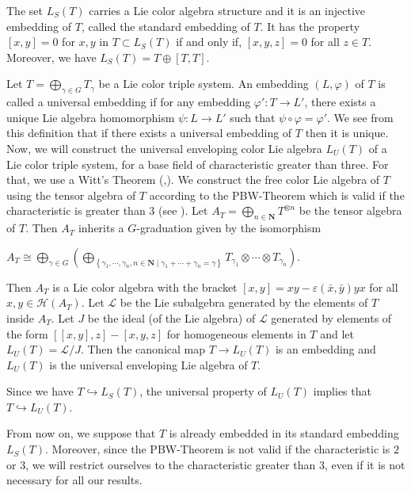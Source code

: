 \documentclass[11pt, twoside]{article}
\begin{document}
\begin{thm}[\cite{KZ23}]
   The set  $L_S(T) $ carries a Lie color algebra structure and it is an injective embedding of $T$, called the standard embedding of $T$. It has the property $[x,y]=0 $ for $x,y$ in $T\subset L_S(T)$ if and only if, $[x,y,z]=0 $ for all $z\in T $. Moreover, we have  $L_S(T)= T \oplus [T,T] $.
\end{thm} 


Let $T= \bigoplus\limits_{\gamma\in G}T_\gamma$ be a Lie color triple system. An embedding $(L,\varphi) $ of $T$ is called a universal embedding if for any embedding $\varphi':T\to L' $, there exists a unique Lie algebra homomorphism $\psi:L\to L' $ such that $\psi\circ\varphi= \varphi' $. We see from this definition that if there exists a universal embedding of $T$ then it is unique. Now, we will construct the universal enveloping color Lie algebra $L_U(T) $ of a Lie color triple system, for a base field of characteristic greater than three. For that, we use a Witt's Theorem  (\cite[Theorem $I.3.1 $]{S67},\cite[p.541]{H01}). We  construct the free color Lie algebra of $T$ using the tensor algebra of $T$ according to the PBW-Theorem which is valid if the characteristic is greater than $3$ (see \cite[p.85]{BMPZ92}).  Let $A_T = \bigoplus\limits_{n\in \mathbf{N}}T^{\otimes n} $ be the tensor algebra of $T$. Then $A_T$ inherits a $G$-graduation given by the isomorphism \begin{center}
    $A_T\cong \bigoplus\limits_{\gamma\in G} (\bigoplus\limits_{\left\{\gamma_1,\cdots,\gamma_n, n\in \mathbf{N}\mid \gamma_1+\cdots+\gamma_n= \gamma   \right\} }T_{\gamma_1}\otimes\cdots\otimes T_{\gamma_n}).  $  \end{center} Then $A_T$ is a Lie color algebra with the bracket $[x,y]= x y- \varepsilon(\bar{x},\bar{y})y x $ for all $x,y \in \mathcal{H}(A_T)$. Let $\mathcal{L} $ be the Lie subalgebra generated by the elements of $T$ inside $A_T$. Let $J$ be the ideal (of the Lie algebra) of $\mathcal{L}$ generated by elements of the form $[[x,y],z]-[x,y,z] $ for homogeneous elements in $T$ and let $L_U(T)=\mathcal{L}/J $. Then the canonical map $T\to L_U(T)$ is an embedding and $L_U(T) $ is the universal enveloping Lie algebra of $T$.

Since we have $T\hookrightarrow L_S(T) $, the universal property of $L_U(T)$ implies that $T\hookrightarrow L_U(T)$. 
\newline

From now on, we suppose that $T$ is already embedded in its standard embedding $L_S(T)$. Moreover, since the PBW-Theorem is not valid if the characteristic is $2$ or $3$, we will restrict ourselves to the characteristic greater than $3$, even if it is not necessary for all our results.
\end{document}
